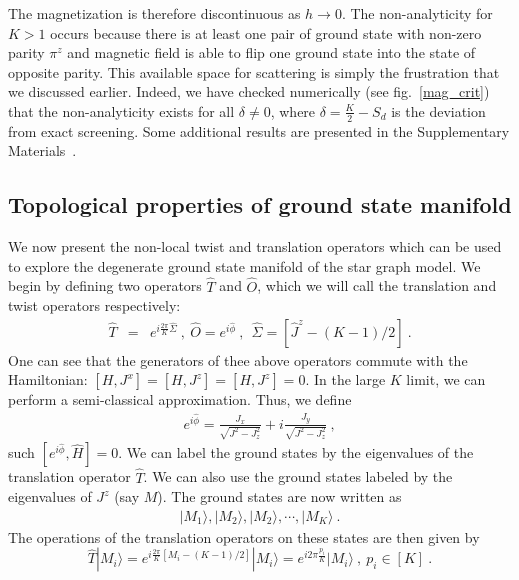 \documentclass[reprint,prb,superscriptaddress]{revtex4-2}
\begin{document}
The magnetization is therefore discontinuous as \(h\to 0\). The non-analyticity for \(K>1\) occurs because there is at least one pair of ground state with non-zero parity \(\pi^z\) and magnetic field is able to flip one ground state into the state of opposite parity. This available space for scattering is simply the frustration that we discussed earlier. Indeed, we have checked numerically (see fig.~\ref{mag_crit}) that the non-analyticity exists for all \(\delta \neq 0\), where \(\delta = \frac{K}{2} - S_{d}\) is the deviation from exact screening. 
Some additional results are presented in the Supplementary Materials~\cite{SM}.
\subsection{Topological properties of ground state manifold}
\label{sec:topo_ground_state}
We now present the non-local twist and translation operators which can be used to explore the degenerate ground state manifold of the star graph model.
We begin by defining two operators $\hat{T}$ and $\hat{O}$, which we will call the translation and twist operators respectively: 
\begin{eqnarray}
\hat{T} &=& e^{i\frac{2\pi}{K} \hat{\Sigma}} ~,~\hat{O} = e^{i\hat{\phi}}~,~~\hat{\Sigma}=[\hat{J}^z-(K-1)/2]~.
\end{eqnarray}
One can see that the generators of thee above operators commute with the Hamiltonian: $[H,J^x]=[H,J^z]=[H,J^z]=0$. In the large \(K\) limit, we can perform a semi-classical approximation. 
Thus, we define
\begin{eqnarray}
e^{i\hat{\phi}} = \frac{J_{x}}{\sqrt{J^{2} - J_{z}^{2}}} + i\frac{J_{y}}{\sqrt{J^{2} - J_{z}^{2}}}~,
\end{eqnarray}
such $[e^{i\hat{\phi}},\hat{H}]=0$. We can label the ground states by the eigenvalues of the translation operator $\hat{T}$. We can also use the ground states labeled by the eigenvalues of $J^z$ (say $M$). The ground states are now written as 
\begin{eqnarray}
|M_1\rangle,|M_2\rangle,|M_2\rangle,\cdots ,|M_K\rangle~.
\end{eqnarray}
The operations of the translation operators on these states are then given by
\begin{equation}
\hat{T}|M_i\rangle = e^{i\frac{2\pi}{K} [M_i-(K-1)/2]} |M_i\rangle = e^{i2\pi\frac{p_i}{K} } |M_i\rangle~,~p_i\in[K]~.
\end{equation}
\end{document}
